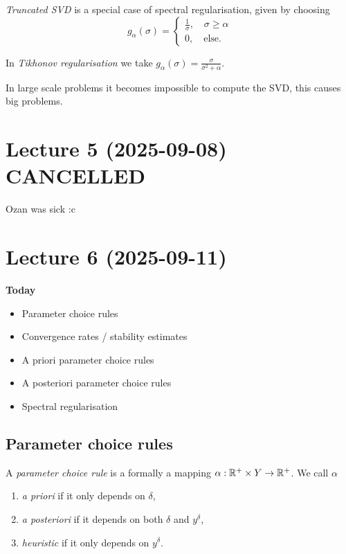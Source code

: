 \documentclass[12pt]{article}
\begin{document}
\begin{definition}
    \textit{Truncated SVD} is a special case of spectral regularisation, given by choosing \begin{equation*}
        g_\alpha(\sigma) = \begin{cases}
            \frac{1}{\sigma}, \quad \sigma\geq \alpha\\
            0, \quad \text{else}.
        \end{cases}
    \end{equation*}
\end{definition}

\begin{definition}
    In \textit{Tikhonov regularisation} we take $g_\alpha(\sigma) = \frac{\sigma}{\sigma^2 + \alpha}$.
\end{definition}

In large scale problems it becomes impossible to compute the SVD, this causes big problems.

\newpage

\section{Lecture 5 (2025-09-08) CANCELLED}
Ozan was sick :c

\newpage

\section{Lecture 6 (2025-09-11)}
\textbf{Today}
\begin{itemize}
    \item Parameter choice rules
    \item Convergence rates / stability estimates
    \item A priori parameter choice rules
    \item A posteriori parameter choice rules
    \item Spectral regularisation
\end{itemize}

\subsection{Parameter choice rules}
\begin{definition}
    A \textit{parameter choice rule} is a formally a mapping $\alpha:\mathbb{R}^+\times Y\to \mathbb{R}^+$. We call $\alpha$
    \begin{enumerate}[label =(\roman*)]
        \item \textit{a priori} if it only depends on $\delta$,
        \item \textit{a posteriori} if it depends on both $\delta$ and $y^\delta$,
        \item \textit{heuristic} if it only depends on $y^\delta$.
    \end{enumerate}
\end{definition}
\end{document}
